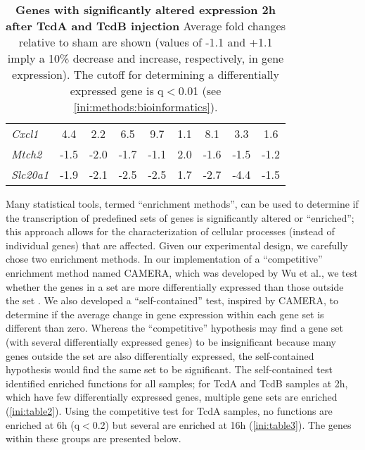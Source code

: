\begin{table}
\begin{center}
{\begin{tabular}{ l c c c | c c c | c c }
\textit{Cxcl1} & 4.4 & 2.2 & 6.5 & 9.7 & 1.1 & 8.1 & 3.3 & 1.6 \\
\textit{Mtch2} & -1.5 & -2.0 & -1.7 & -1.1 & 2.0 & -1.6 & -1.5 & -1.2 \\
\textit{Slc20a1} & -1.9 & -2.1 & -2.5 & -2.5 & 1.7 & -2.7 & -4.4 & -1.5 \\
\end{tabular}
}%
\caption[Genes with significantly altered expression 2h after TcdA or TcdB injection]{
 \textbf{Genes with significantly altered expression 2h after TcdA and TcdB injection}
Average fold changes relative to sham are shown (values of -1.1 and +1.1 
imply a 10\% decrease and increase, respectively, in gene expression). 
The cutoff for determining a differentially expressed gene is q$<$0.01 
(see \ref{ini:methods:bioinformatics}). }
\label{ini:table1}
\end{center}
\end{table}


Many statistical tools, termed ``enrichment methods'', can be used 
to determine if the transcription of predefined sets of genes is 
significantly altered or ``enriched''; this approach allows for the 
characterization of cellular processes (instead of individual genes) 
that are affected. Given our experimental design, we carefully 
chose two enrichment methods. In our implementation of a ``competitive'' 
enrichment method named CAMERA, which was developed by Wu et al., we test 
whether the genes in a set are more differentially expressed than those 
outside the set \cite{Wu:2012kp}. We also developed a ``self-contained'' 
test, inspired by CAMERA, to determine if the average change in gene 
expression within each gene set is different than zero. Whereas the 
``competitive'' hypothesis may find a gene set (with several differentially 
expressed genes) to be insignificant because many genes outside the 
set are also differentially expressed, the self-contained hypothesis 
would find the same set to be significant. The self-contained test 
identified enriched functions for all samples; for TcdA and TcdB 
samples at 2h, which have few differentially expressed genes, multiple 
gene sets are enriched (\autoref{ini:table2}). Using the competitive 
test for TcdA samples, no functions are enriched at 6h (q$<$0.2) but 
several are enriched at 16h (\autoref{ini:table3}). The genes within 
these groups are presented below.

